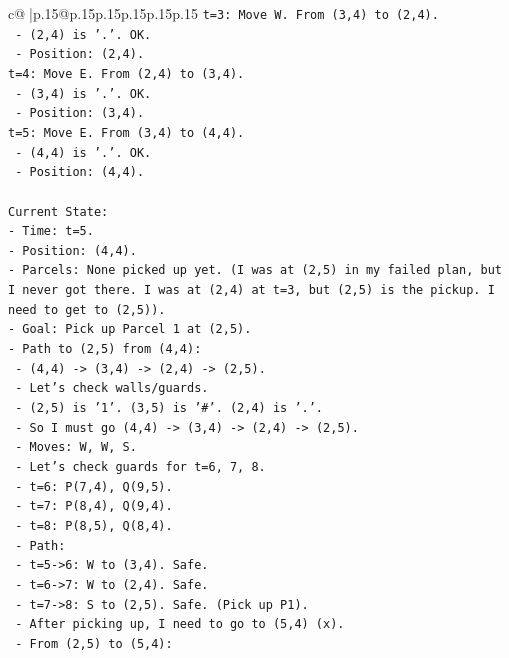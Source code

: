 \documentclass{article}
\begin{document}
{\begin{supertabular}{c@{$\;$}|p{.15\linewidth}@{}p{.15\linewidth}p{.15\linewidth}p{.15\linewidth}p{.15\linewidth}p{.15\linewidth}}
{{{\texttt{t=3: Move W. From (3,4) to (2,4).} \\
\texttt{  {-} (2,4) is '.'. OK.} \\
\texttt{  {-} Position: (2,4).} \\
\texttt{t=4: Move E. From (2,4) to (3,4).} \\
\texttt{  {-} (3,4) is '.'. OK.} \\
\texttt{  {-} Position: (3,4).} \\
\texttt{t=5: Move E. From (3,4) to (4,4).} \\
\texttt{  {-} (4,4) is '.'. OK.} \\
\texttt{  {-} Position: (4,4).} \\
\\ 
\texttt{Current State:} \\
\texttt{{-} Time: t=5.} \\
\texttt{{-} Position: (4,4).} \\
\texttt{{-} Parcels: None picked up yet. (I was at (2,5) in my failed plan, but I never got there. I was at (2,4) at t=3, but (2,5) is the pickup. I need to get to (2,5)).} \\
\texttt{{-} Goal: Pick up Parcel 1 at (2,5).} \\
\texttt{{-} Path to (2,5) from (4,4):} \\
\texttt{  {-} (4,4) {-}> (3,4) {-}> (2,4) {-}> (2,5).} \\
\texttt{  {-} Let's check walls/guards.} \\
\texttt{  {-} (2,5) is '1'. (3,5) is '\#'. (2,4) is '.'.} \\
\texttt{  {-} So I must go (4,4) {-}> (3,4) {-}> (2,4) {-}> (2,5).} \\
\texttt{  {-} Moves: W, W, S.} \\
\texttt{  {-} Let's check guards for t=6, 7, 8.} \\
\texttt{    {-} t=6: P(7,4), Q(9,5).} \\
\texttt{    {-} t=7: P(8,4), Q(9,4).} \\
\texttt{    {-} t=8: P(8,5), Q(8,4).} \\
\texttt{  {-} Path:} \\
\texttt{    {-} t=5{-}>6: W to (3,4). Safe.} \\
\texttt{    {-} t=6{-}>7: W to (2,4). Safe.} \\
\texttt{    {-} t=7{-}>8: S to (2,5). Safe. (Pick up P1).} \\
\texttt{  {-} After picking up, I need to go to (5,4) (x).} \\
\texttt{  {-} From (2,5) to (5,4):} \\
}}}
\end{supertabular}}
\end{document}
